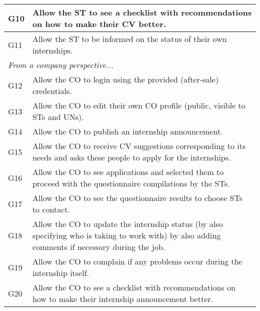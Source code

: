 \begin{longtable}{|l|p{}|}
    \hline
    G10           & Allow the ST to see a checklist with recommendations on how to make their CV better.                                                              \\
    \hline
    G11           & Allow the ST to be informed on the status of their own internships.                                                                               \\
    \hline \hline
    \multicolumn{2}{|l|}{\textit{From a company perspective...}}                                                                                                      \\
    \hline
    G12           & Allow the CO to login using the provided (after-sale) credentials.                                                                                \\
    \hline
    G13           & Allow the CO to edit their own CO profile (public, visible to STs and UNs).                                                                       \\
    \hline
    G14           & Allow the CO to publish an internship announcement.                                                                                               \\
    \hline
    G15           & Allow the CO to receive CV suggestions corresponding to its needs and asks these people to apply for the internships.                             \\
    \hline
    G16           & Allow the CO to see applications and selected them to proceed with the questionnaire compilations by the STs.                                     \\
    \hline
    G17           & Allow the CO to see the questionnaire results to choose STs to contact.                                                                           \\
    \hline
    G18           & Allow the CO to update the internship status (by also specifying who is taking to work with) by also adding comments if necessary during the job. \\
    \hline
    G19           & Allow the CO to complain if any problems occur during the internship itself.                                                                      \\
    \hline
    G20           & Allow the CO to see a checklist with recommendations on how to make their internship announcement better.                                         \\

\end{longtable}
